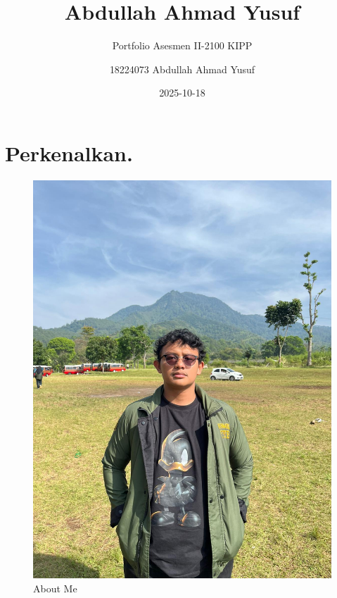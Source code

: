 \documentclass[
  letterpaper,
  DIV=11,
  numbers=noendperiod]{scrreprt}
\title{Abdullah Ahmad Yusuf}
\subtitle{Portfolio Asesmen II-2100 KIPP}
\author{18224073 Abdullah Ahmad Yusuf}
\date{2025-10-18}
\renewcommand*\contentsname{Table of contents}
\newcommand\contentsname{Table of contents}
\begin{document}
\maketitle

\renewcommand*\contentsname{Table of contents}
{
\hypersetup{linkcolor=}
\setcounter{tocdepth}{2}
\tableofcontents
}


\chapter*{Perkenalkan.}\label{perkenalkan.}


\begin{figure}[H]

{\centering \includegraphics[width=9.5\linewidth,height=\textheight,keepaspectratio]{images/ayus.jpg}

}

\caption{About Me}

\end{figure}%
\end{document}
